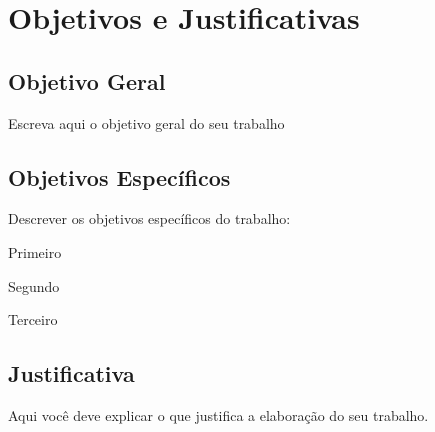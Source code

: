 \chapter{Objetivos e Justificativas}

\section{Objetivo Geral}

Escreva aqui o objetivo geral do seu trabalho

\section{Objetivos Específicos}

Descrever os objetivos específicos do trabalho:
\begin{alineas}
	\item Primeiro
	\item Segundo
	\item Terceiro
\end{alineas}

\section{Justificativa}

Aqui você deve explicar o que justifica a elaboração do seu trabalho.